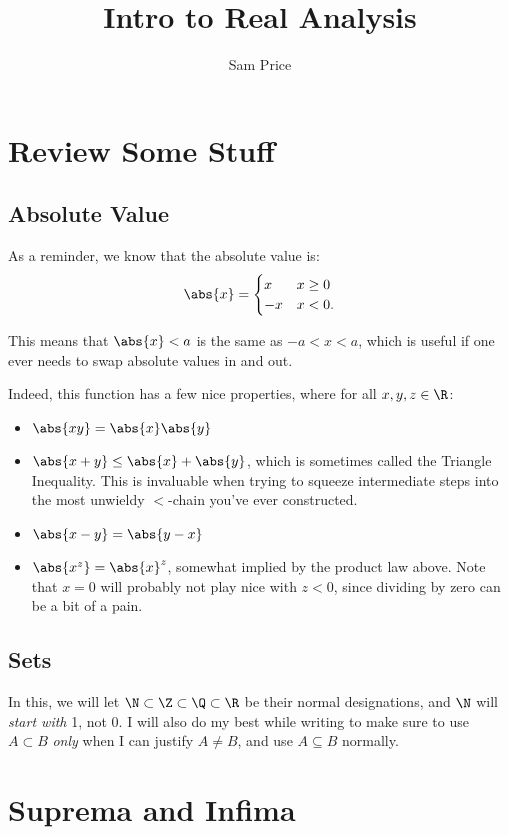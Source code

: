 \documentclass{article}
\title{Intro to Real Analysis}
\author{Sam Price}
\begin{document}
\maketitle


\section*{Review Some Stuff}

\subsection*{Absolute Value}
As a reminder, we know that the absolute value is:
\[ \abs{x} = \begin{cases} x & x \ge 0\\ -x & x < 0. \end{cases} \]

This means that $\abs{x} < a$ is the same as $-a < x < a$, which is useful if one ever needs to swap absolute values in and out.

Indeed, this function has a few nice properties, where for all $x, y, z \in \R$:
\begin{itemize}
  \item $\abs{xy} = \abs{x}\abs{y}$
  \item $\abs{x + y} \le \abs{x} + \abs{y}$, which is sometimes called the Triangle Inequality.
        This is invaluable when trying to squeeze intermediate steps into the most
        unwieldy $<$-chain you've ever constructed.
  \item $\abs{x - y} = \abs{y - x}$
  \item $\abs{x^{z}} = \abs{x}^{z}$, somewhat implied by the product law above.
        Note that $x = 0$ will probably not play nice with $z < 0$, since dividing by
        zero can be a bit of a pain.
\end{itemize}

\subsection*{Sets}
In this, we will let $\N \subset \Z \subset \Q \subset \R$ be their normal designations, and $\N$ will \emph{start with} 1, not 0.
I will also do my best while writing to make sure to use $A \subset B$ \emph{only} when I can justify $A \ne B$, and use $A \subseteq B$ normally.

\section*{Suprema and Infima}
\end{document}
